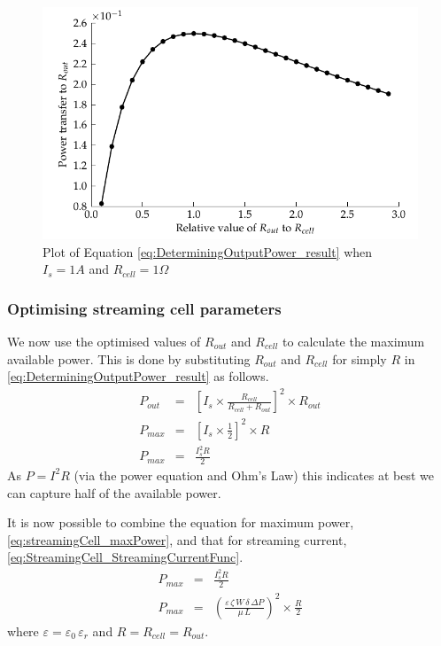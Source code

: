       \begin{figure}
          \centering
              \includegraphics{content/pt1/01-PowerHarvesting/graphics/maximumPowerThereom}
          \caption{\label{fig:Plot-of-PowerTheorem}Plot of Equation \ref{eq:DeterminingOutputPower_result} when $I_{s}=1A$ and $R_{cell}=1\Omega$}
      \end{figure}


    \subsubsection*{Optimising streaming cell parameters}


      We now use the optimised values of $R_{out}$ and $R_{cell}$ to calculate the maximum available power.
      This is done by substituting $R_{out}$ and $R_{cell}$ for simply $R$ in \eqref{eq:DeterminingOutputPower_result} as follows.
      \begin{eqnarray}
          P_{out} & = & \left[I_{s}\times\frac{R_{cell}}{R_{cell}+R_{out}}\right]^{2}\times R_{out}\nonumber \\
          P_{max} & = & \left[I_{s}\times\frac{1}{2}\right]^{2}\times R\nonumber \\
          P_{max} & = & \frac{I_{s}^{2}R}{2}
          \label{eq:streamingCell_maxPower}
      \end{eqnarray}
      As $P=I^{2}R$ (via the power equation and Ohm's Law) this indicates at best we can capture half of the available power.

      It is now possible to combine the equation for maximum power, \eqref{eq:streamingCell_maxPower}, and that for streaming current, \eqref{eq:StreamingCell_StreamingCurrentFunc}.
      \begin{eqnarray}
          P_{max} & = & \frac{I_{s}^{2}R}{2}\nonumber \\
          P_{max} & = & \left(\frac{\varepsilon\,\zeta\,W\,\delta\,\Delta P}{\mu\,L}\right)^{2}\times\frac{R}{2}
          \label{eq:streamingCell_maxPower_substituted}
      \end{eqnarray}
      where $\varepsilon=\varepsilon_{0}\,\varepsilon_{r}$ and $R=R_{cell}=R_{out}$.

